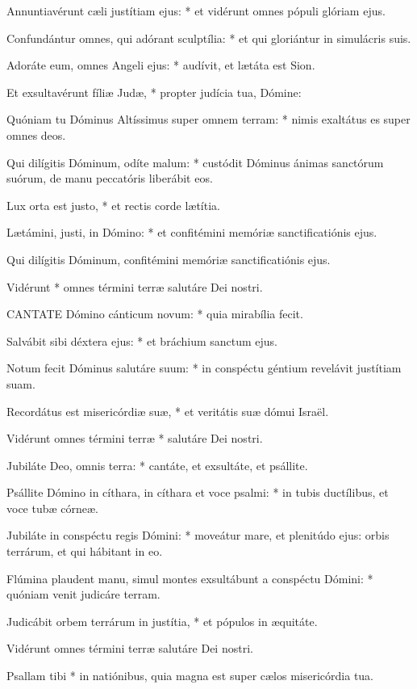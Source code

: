 Annuntiavérunt cæli justítiam ejus: * et vidérunt omnes pópuli glóriam ejus.

Confundántur omnes, qui adórant sculptília: * et qui gloriántur in simulácris suis.

Adoráte eum, omnes Angeli ejus: * audívit, et lætáta est Sion.

Et exsultavérunt fíliæ Judæ, * propter judícia tua, Dómine:

Quóniam tu Dóminus Altíssimus super omnem terram: * nimis exaltátus es super omnes deos.

Qui dilígitis Dóminum, odíte malum: * custódit Dóminus ánimas sanctórum suórum, de manu peccatóris liberábit eos.

Lux orta est justo, * et rectis corde lætítia.

Lætámini, justi, in Dómino: * et confitémini memóriæ sanctificatiónis ejus.

 Qui dilígitis Dóminum, confitémini memóriæ sanctificatiónis ejus.

 Vidérunt * omnes términi terræ salutáre Dei nostri.


\lettrine[lines=2]{C}{ANTATE} Dómino cánticum novum: * quia mirabília fecit.

Salvábit sibi déxtera ejus: * et bráchium sanctum ejus.

Notum fecit Dóminus salutáre suum: * in conspéctu géntium revelávit justítiam suam.

Recordátus est misericórdiæ suæ, * et veritátis suæ dómui Israël.

Vidérunt omnes términi terræ * salutáre Dei nostri.

Jubiláte Deo, omnis terra: * cantáte, et exsultáte, et psállite.

Psállite Dómino in cíthara, in cíthara et voce psalmi: * in tubis ductílibus, et voce tubæ córneæ.

Jubiláte in conspéctu regis Dómini: * moveátur mare, et plenitúdo ejus: orbis terrárum, et qui hábitant in eo.

Flúmina plaudent manu, simul montes exsultábunt a conspéctu Dómini: * quóniam venit judicáre terram.

Judicábit orbem terrárum in justítia, * et pópulos in æquitáte.

 Vidérunt omnes términi terræ salutáre Dei nostri.

 Psallam tibi * in natiónibus, quia magna est super cælos misericórdia tua.


